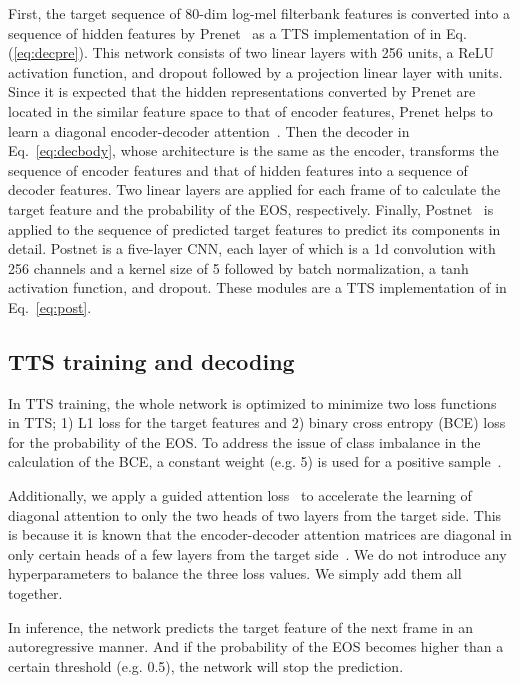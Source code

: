 First, the target sequence of 80-dim log-mel filterbank features is converted into a sequence of hidden features by Prenet~\cite{DBLP:conf/icassp/ShenPWSJYCZWRSA18} as a TTS implementation of  in Eq. (\ref{eq:decpre}). 
This network consists of two linear layers with 256 units, a ReLU activation function, and dropout followed by a projection linear layer with  units.
Since it is expected that the hidden representations converted by Prenet are located in the similar feature space to that of encoder features, Prenet helps to learn a diagonal encoder-decoder attention~\cite{li2019close}.
Then the decoder  in Eq.~\eqref{eq:decbody}, whose architecture is the same as the encoder, transforms the sequence of encoder features and that of hidden features into a sequence of decoder features.
Two linear layers are applied for each frame of  to calculate the target feature and the probability of the EOS, respectively.
Finally, Postnet~\cite{DBLP:conf/icassp/ShenPWSJYCZWRSA18} is applied to the sequence of predicted target features to predict its components in detail. 
Postnet is a five-layer CNN, each layer of which is a 1d convolution with 256 channels and a kernel size of 5 followed by batch normalization, a tanh activation function, and dropout.
These modules are a TTS implementation of  in Eq.~\eqref{eq:post}.

\subsection{TTS training and decoding}
In TTS training, the whole network is optimized to minimize two loss functions in TTS; 1) L1 loss for the target features and 2) binary cross entropy (BCE) loss for the probability of the EOS.
To address the issue of class imbalance in the calculation of the BCE, a constant weight (e.g. 5) is used for a positive sample~\cite{li2019close}.

Additionally, we apply a guided attention loss~\cite{tachibana2018efficiently} to accelerate the learning of diagonal attention to only the two heads of two layers from the target side. This is because it is known that the encoder-decoder attention matrices are diagonal in only certain heads of a few layers from the target side~\cite{li2019close}.
We do not introduce any hyperparameters to balance the three loss values. We simply add them all together.

In inference, the network predicts the target feature of the next frame in an autoregressive manner. 
And if the probability of the EOS becomes higher than a certain threshold (e.g. 0.5), the network will stop the prediction.


